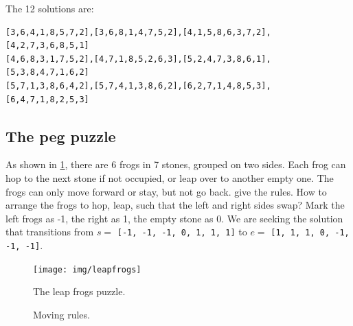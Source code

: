 \documentclass[b5paper]{article}
\begin{document}
\begin{Answer}[ref = {ex:queens-puzzle}]
{

The 12 solutions are:
\begin{Verbatim}[fontsize=\footnotesize]
[3,6,4,1,8,5,7,2],[3,6,8,1,4,7,5,2],[4,1,5,8,6,3,7,2],[4,2,7,3,6,8,5,1]
[4,6,8,3,1,7,5,2],[4,7,1,8,5,2,6,3],[5,2,4,7,3,8,6,1],[5,3,8,4,7,1,6,2]
[5,7,1,3,8,6,4,2],[5,7,4,1,3,8,6,2],[6,2,7,1,4,8,5,3],[6,4,7,1,8,2,5,3]
\end{Verbatim}
}
\end{Answer}

\subsection{The peg puzzle}

As shown in \cref{fig:leapfrog}, there are 6 frogs in 7 stones, grouped on two sides. Each frog can hop to the next stone if not occupied, or leap over to another empty one. The frogs can only move forward or stay, but not go back.  give the rules. How to arrange the frogs to hop, leap, such that the left and right sides swap? Mark the left frogs as -1, the right as 1, the empty stone as 0. We are seeking the solution that transitions from $s =$ \texttt{[-1, -1, -1, 0, 1, 1, 1]} to $e =$ \texttt{[1, 1, 1, 0, -1, -1, -1]}.

\begin{figure}[htbp]
 \centering
 \texttt{[image: img/leapfrogs]}
 \caption{The leap frogs puzzle.}
 \label{fig:leapfrog}
\end{figure}

\begin{figure}[htbp]
 \centering
  \hspace{0.02\textwidth}
  \hspace{0.02\textwidth}
 \caption{Moving rules.}
 \label{fig:pegrules}
\end{figure}
\end{document}
